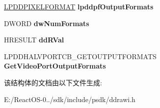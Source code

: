 \begin{DoxyCompactItemize}
\hyperlink{interfacevoid}{L\+P\+D\+D\+P\+I\+X\+E\+L\+F\+O\+R\+M\+AT} {\bfseries lpddpf\+Output\+Formats}
\item 
\mbox{\label{struct___d_d_h_a_l___g_e_t_v_p_o_r_t_o_u_t_p_u_t_f_o_r_m_a_t_d_a_t_a_a218edb74290477801499b0d67da83363}} 
D\+W\+O\+RD {\bfseries dw\+Num\+Formats}
\item 
\mbox{\label{struct___d_d_h_a_l___g_e_t_v_p_o_r_t_o_u_t_p_u_t_f_o_r_m_a_t_d_a_t_a_a154d787b7c332a79ece2a0cf3c041492}} 
H\+R\+E\+S\+U\+LT {\bfseries dd\+R\+Val}
\item 
\mbox{\label{struct___d_d_h_a_l___g_e_t_v_p_o_r_t_o_u_t_p_u_t_f_o_r_m_a_t_d_a_t_a_af09d21b11b329547feec676e767d0ff5}} 
L\+P\+D\+D\+H\+A\+L\+V\+P\+O\+R\+T\+C\+B\+\_\+\+G\+E\+T\+O\+U\+T\+P\+U\+T\+F\+O\+R\+M\+A\+TS {\bfseries Get\+Video\+Port\+Output\+Formats}
\end{DoxyCompactItemize}


该结构体的文档由以下文件生成\+:\begin{DoxyCompactItemize}
\item 
E\+:/\+React\+O\+S-\/0../sdk/include/psdk/ddrawi.\+h\end{DoxyCompactItemize}
